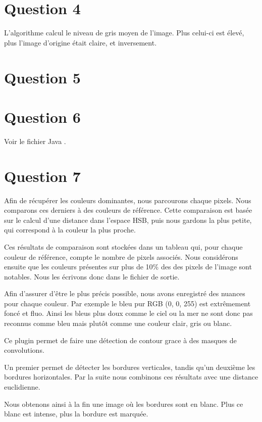 \documentclass{report}
\begin{document}
		\section{Question 4}
			
			
			L'algorithme calcul le niveau de gris moyen de l'image. Plus celui-ci est élevé, plus l'image d'origine était claire, et inversement.
			
		\section{Question 5}
			
			
		\section{Question 6}
			Voir le fichier Java .
		
		\section{Question 7}
			
			
			Afin de récupérer les couleurs dominantes, nous parcourons chaque pixels. Nous comparons ces derniers à des couleurs de référence. Cette comparaison est basée sur le calcul d'une distance dans l'espace HSB, puis nous gardons la plus petite, qui correspond à la couleur la plus proche.
			
			Ces résultats de comparaison sont stockées dans un tableau qui, pour chaque couleur de référence, compte le nombre de pixels associés. Nous considérons ensuite que les couleurs présentes sur plus de 10\% des des pixels de l'image sont notables. Nous les écrivons donc dans le fichier de sortie.
			
			Afin d'assurer d'être le plus précis possible, nous avons enregistré des nuances pour chaque couleur. Par exemple le bleu pur RGB (0, 0, 255) est extrêmement foncé et fluo. Ainsi les bleus plus doux comme le ciel ou la mer ne sont donc pas reconnus comme bleu mais plutôt comme une couleur clair, gris ou blanc.
			
			
			
			
			Ce plugin permet de faire une détection de contour grace à des masques de convolutions.
			
			Un premier permet de détecter les bordures verticales, tandis qu'un deuxième les bordures horizontales. Par la suite nous combinons ces résultats avec une distance euclidienne.
			
			Nous obtenons ainsi à la fin une image où les bordures sont en blanc. Plus ce blanc est intense, plus la bordure est marquée.
			
\end{document}
